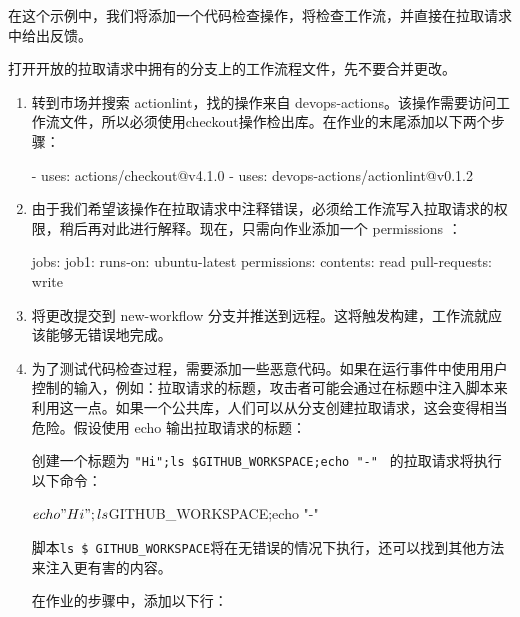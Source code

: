 
在这个示例中，我们将添加一个代码检查操作，将检查工作流，并直接在拉取请求中给出反馈。


打开开放的拉取请求中拥有的分支上的工作流程文件，先不要合并更改。


\begin{enumerate}
\item 
转到市场并搜索 actionlint，找的操作来自 devops-actions。该操作需要访问工作流文件，所以必须使用checkout操作检出库。在作业的末尾添加以下两个步骤：

\begin{shell}
- uses: actions/checkout@v4.1.0
- uses: devops-actions/actionlint@v0.1.2
\end{shell}

\item 
由于我们希望该操作在拉取请求中注释错误，必须给工作流写入拉取请求的权限，稍后再对此进行解释。现在，只需向作业添加一个 permissions ：

\begin{shell}
jobs:
  job1:
    runs-on: ubuntu-latest
    permissions:
      contents: read
      pull-requests: write
\end{shell}

\item 
将更改提交到 new-workflow 分支并推送到远程。这将触发构建，工作流就应该能够无错误地完成。

\item 
为了测试代码检查过程，需要添加一些恶意代码。如果在运行事件中使用用户控制的输入，例如：拉取请求的标题，攻击者可能会通过在标题中注入脚本来利用这一点。如果一个公共库，人们可以从分支创建拉取请求，这会变得相当危险。假设使用 echo 输出拉取请求的标题：


创建一个标题为 \verb|"Hi";ls $GITHUB_WORKSPACE;echo "-" | 的拉取请求将执行以下命令：

\begin{shell}
$ echo "Hi";ls $GITHUB_WORKSPACE;echo "-"
\end{shell}

脚本\verb|ls $ GITHUB_WORKSPACE|将在无错误的情况下执行，还可以找到其他方法来注入更有害的内容。

在作业的步骤中，添加以下行：


\end{enumerate}
